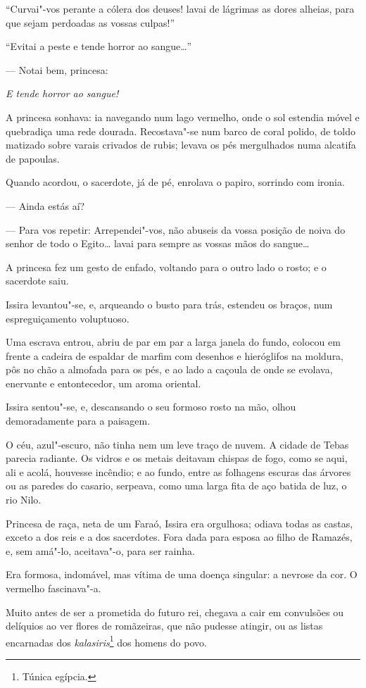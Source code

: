 ``Curvai"-vos perante a cólera dos deuses! lavai de lágrimas as dores
alheias, para que sejam perdoadas as vossas culpas!''

``Evitai a peste e tende horror ao sangue\ldots{}''

--- Notai bem, princesa:

\emph{E tende horror ao sangue!}

A princesa sonhava: ia navegando num lago vermelho, onde o sol estendia
móvel e quebradiça uma rede dourada. Recostava"-se num barco de coral
polido, de toldo matizado sobre varais crivados de rubis; levava os pés
mergulhados numa alcatifa de papoulas.

Quando acordou, o sacerdote, já de pé, enrolava o papiro, sorrindo com
ironia.

--- Ainda estás aí?

--- Para vos repetir: Arrependei"-vos, não abuseis da vossa posição de
noiva do senhor de todo o Egito\ldots{} lavai para sempre as vossas mãos do
sangue\ldots{}

A princesa fez um gesto de enfado, voltando para o outro lado o rosto; e
o sacerdote saiu.

Issira levantou"-se, e, arqueando o busto para trás, estendeu os braços,
num espreguiçamento voluptuoso.

Uma escrava entrou, abriu de par em par a larga janela do fundo, colocou
em frente a cadeira de espaldar de marfim com desenhos e hieróglifos na
moldura, pôs no chão a almofada para os pés, e ao lado a caçoula de onde
se evolava, enervante e entontecedor, um aroma oriental.

Issira sentou"-se, e, descansando o seu formoso rosto na mão, olhou
demoradamente para a paisagem.

O céu, azul"-escuro, não tinha nem um leve traço de nuvem. A cidade de
Tebas parecia radiante. Os vidros e os metais deitavam chispas de fogo,
como se aqui, ali e acolá, houvesse incêndio; e ao fundo, entre as
folhagens escuras das árvores ou as paredes do casario, serpeava, como
uma larga fita de aço batida de luz, o rio Nilo.

Princesa de raça, neta de um Faraó, Issira era orgulhosa; odiava todas
as castas, exceto a dos reis e a dos sacerdotes. Fora dada para esposa
ao filho de Ramazés, e, sem amá"-lo, aceitava"-o, para ser rainha.

Era formosa, indomável, mas vítima de uma doença singular: a nevrose da
cor. O vermelho fascinava"-a.

Muito antes de ser a prometida do futuro rei, chegava a cair em
convulsões ou delíquios ao ver flores de romãzeiras, que não pudesse
atingir, ou as listas encarnadas dos \emph{kalasiris}\footnote{Túnica
  egípcia.} dos homens do povo.

